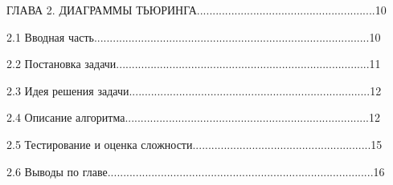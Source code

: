 \documentclass{article}
\begin{document}
\vspace{-0.2cm}
\noindent
ГЛАВА 2. ДИАГРАММЫ ТЬЮРИНГА.........................................................10\\
\vspace{-0.2cm}
\par 2.1 Вводная часть........................................................................................10\\
\vspace{-0.2cm}
\par 2.2 Постановка задачи.................................................................................11\\
\vspace{-0.2cm}
\par 2.3 Идея решения задачи.............................................................................12\\
\vspace{-0.2cm}
\par 2.4 Описание алгоритма..............................................................................12\\
\vspace{-0.2cm}
\par 2.5 Тестирование и оценка сложности.........................................................15\\
\vspace{-0.2cm}
\par 2.6 Выводы по главе.....................................................................................16\\
\end{document}
